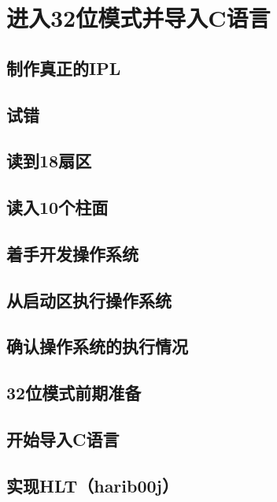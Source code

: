 ﻿\chapter{	进入32位模式并导入C语言	}
\section{	制作真正的IPL	}
\section{	试错	}
\section{	读到18扇区	}
\section{	读入10个柱面	}
\section{	着手开发操作系统	}
\section{	从启动区执行操作系统	}
\section{	确认操作系统的执行情况	}
\section{	32位模式前期准备	}
\section{	开始导入C语言	}
\section{	实现HLT（harib00j）	}
